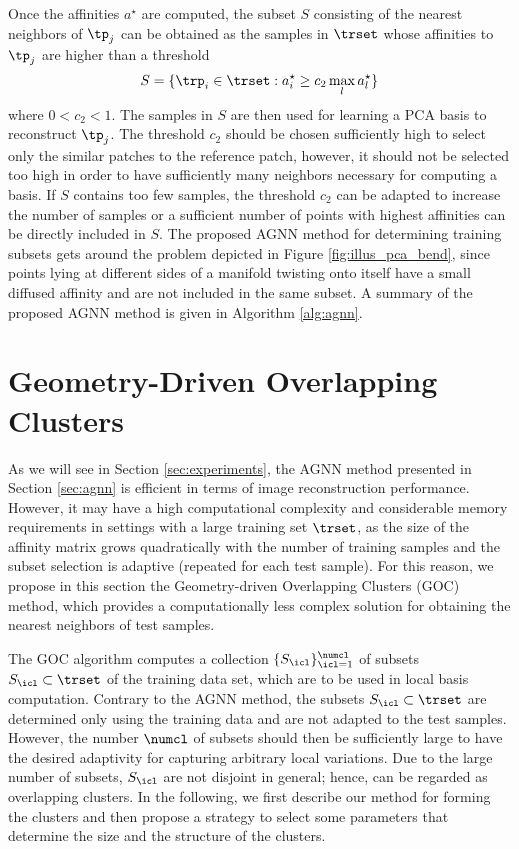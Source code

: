 \documentclass[journal]{IEEEtran}
\begin{document}
Once the affinities $a^{\star}$ are computed, the subset $S$ consisting of the nearest neighbors of $\tp_j$ can be obtained as the samples in $\trset$ whose affinities to $\tp_j$ are higher than a threshold
\begin{equation}
\label{eq:agnn_aff_thres}
S=\{ \trp_i \in \trset : a^{\star}_i \geq  c_2  \max_l a^{\star}_l \}
\end{equation}
where $0<c_2< 1$. The samples in $S$ are then used for learning a PCA basis to reconstruct $\tp_j$. The threshold $c_2$ should be chosen sufficiently high to select only the similar patches to the reference patch, however, it should not be selected too high in order to have sufficiently many neighbors necessary for computing a basis. If $S$ contains too few samples, the threshold $c_2$ can be adapted to increase the number of samples or a sufficient number of points with highest affinities can be directly included in $S$. The proposed AGNN method for determining training subsets gets around the problem depicted in Figure \ref{fig:illus_pca_bend}, since points lying at different sides of a manifold twisting onto itself have a small diffused affinity and are not included in the same subset. A summary of the proposed AGNN method is given in Algorithm \ref{alg:agnn}. 








\section{Geometry-Driven Overlapping Clusters}
\label{sec:goc}

As we will see in Section \ref{sec:experiments}, the AGNN method presented in Section \ref{sec:agnn} is efficient in terms of image reconstruction performance. However, it may have a high computational complexity and considerable memory requirements in settings with a large training set $\trset$, as the size of the affinity matrix grows quadratically with the number of training samples and the subset selection is adaptive (repeated for each test sample). For this reason, we propose in this section the Geometry-driven Overlapping Clusters (GOC) method, which provides a computationally less complex solution for obtaining the nearest neighbors of test samples.

The GOC algorithm computes a collection $\{S_\icl \}_{\icl=1}^\numcl$ of subsets  $S_\icl \subset \trset$ of the training data set, which are to be used in local basis computation. Contrary to the AGNN method, the subsets $S_\icl \subset \trset$ are determined only using the training data and are not adapted to the test samples. However, the number  $\numcl$ of subsets should then be sufficiently large to have the desired adaptivity for capturing arbitrary local variations. Due to the large number of subsets, $S_\icl$ are not disjoint in general; hence, can be regarded as overlapping clusters. In the following, we first describe our method for forming the clusters and then propose a strategy to select some parameters that determine the size and the structure of the clusters. 
\end{document}
